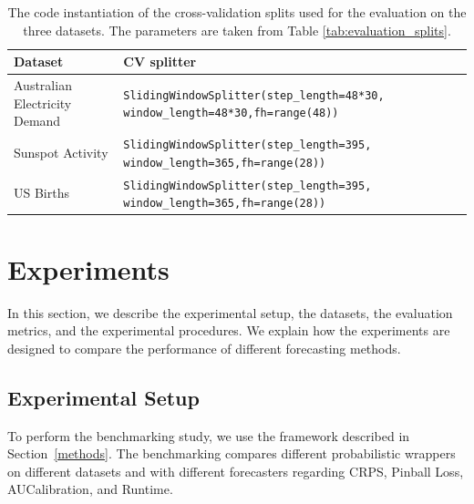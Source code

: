 \begin{table}[h]
    \centering
    \footnotesize
    \caption{The code instantiation of the cross-validation splits used for the evaluation on the three datasets. The parameters are taken from Table \ref{tab:evaluation_splits}.}
    \label{tab:cv_splits}
    \begin{tabularx}{\textwidth}{X|X}
         \toprule
        Dataset & CV splitter \\ \midrule
        Australian Electricity Demand & \texttt{SlidingWindowSplitter(step_length=48*30, window_length=48*30,fh=range(48))} \\  
        Sunspot Activity & \texttt{SlidingWindowSplitter(step_length=395, window_length=365,fh=range(28))}\\
        US Births & \texttt{SlidingWindowSplitter(step_length=395, window_length=365,fh=range(28))}\\
        \bottomrule
    \end{tabularx}
\end{table}



\section{Experiments} \label{experiments}
In this section, we describe the experimental setup, the datasets, the evaluation metrics, and the experimental procedures. We explain how the experiments are designed to compare the performance of different forecasting methods.



\subsection{Experimental Setup}
To perform the benchmarking study, we use the framework described in Section~\ref{methods}. The benchmarking compares different probabilistic wrappers on different datasets and with different forecasters regarding CRPS, Pinball Loss, AUCalibration, and Runtime. 


